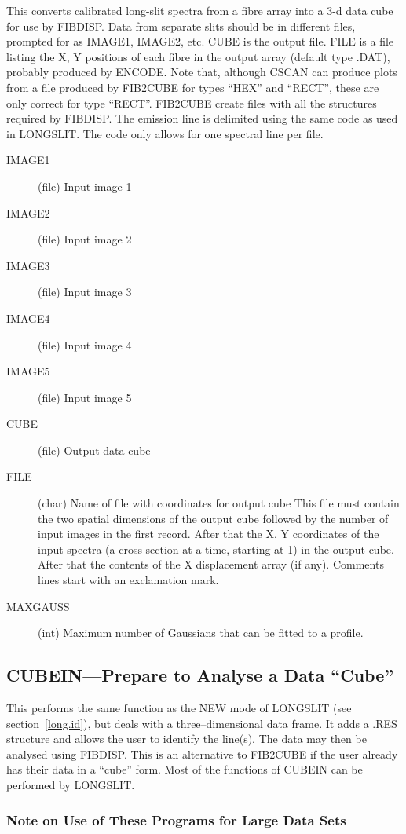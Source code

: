 This converts calibrated long-slit spectra from a fibre array into a
3-d data cube for use by FIBDISP.
Data from separate slits should be in different files, prompted for as
IMAGE1, IMAGE2, etc.
CUBE is the output file.
FILE is a file listing the X, Y positions of each fibre in the output
array (default type .DAT), probably produced by ENCODE.
Note that, although CSCAN can produce plots from a file produced by
FIB2CUBE for types ``HEX'' and ``RECT'', these are only correct for type
``RECT''.
FIB2CUBE create files with all the structures required by FIBDISP.
The emission line is delimited using the same code as used in LONGSLIT.
The code only allows for one spectral line per file.
\begin{description}
\item[IMAGE1] (file) Input image 1
\item[IMAGE2] (file) Input image 2
\item[IMAGE3] (file) Input image 3
\item[IMAGE4] (file) Input image 4
\item[IMAGE5] (file) Input image 5
\item[CUBE] (file) Output data cube
\item[FILE] (char) Name of file with coordinates for output cube This
file must contain the two spatial dimensions of the output cube followed
by the number of input images in the
first record. After that the X, Y coordinates of the input spectra (a
cross-section at a time, starting at 1) in the output cube.
After that the contents of the X displacement array (if any).
Comments lines start with an exclamation mark.
\item[MAXGAUSS] (int) Maximum number of Gaussians that can be fitted
to a profile.
\end{description}

\subsection{CUBEIN---Prepare to Analyse a Data ``Cube''}

This performs the same function as the NEW mode of LONGSLIT (see
section~\ref{long.id}), but deals with a three--dimensional data frame.
It adds a .RES structure and
allows the user to identify the line(s). The data may then be analysed
using FIBDISP. This is an alternative to FIB2CUBE if the user already
has their data in a ``cube'' form. Most of the functions of CUBEIN can
be performed by LONGSLIT.

\subsubsection{Note on Use of These Programs for Large Data Sets}

